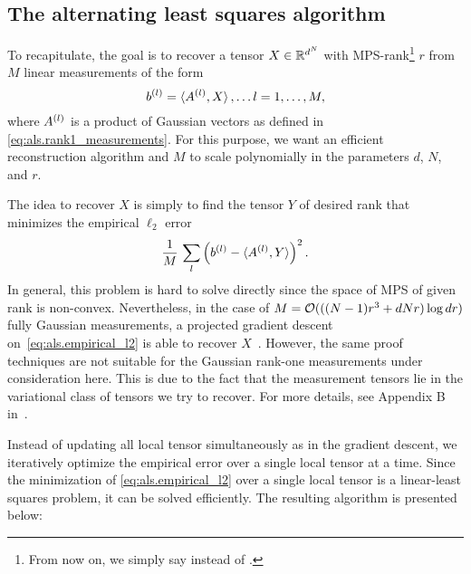 \subsection{The alternating least squares algorithm}%
\label{sub:als.algorithm}

To recapitulate, the goal is to recover a tensor $X \in {\mathbb{R}}^{d^N}$ with MPS-rank\footnote{%
  From now on, we simply say  instead of .
} $r$ from $M$ linear measurements of the form
\[
  b^{(l)} = \braket{A^{(l)}, X}, \ldots l=1,\ldots,M,
\]
where $A^{(l)}$ is a product of Gaussian vectors as defined in \cref{eq:als.rank1_measurements}.
For this purpose, we want an efficient reconstruction algorithm and $M$ to scale polynomially in the parameters $d$, $N$, and $r$.

The idea to recover $X$ is simply to find the tensor $Y$ of desired rank that minimizes the empirical $\ell_2$ error
\[
  \frac{1}{M} \, \sum_l \left( b^{(l)} - \braket{A^{(l)}, Y} \right)^2.
  \label{eq:als.empirical_l2}
\]
In general, this problem is hard to solve directly since the space of MPS of given rank is non-convex.
Nevertheless, in the case of $M={\mathcal{O}}(((N-1)r^3 + dNr) \log dr)$ fully Gaussian measurements, a projected gradient descent on~\eqref{eq:als.empirical_l2} is able to recover $X$~\cite{Rauhut_2014_Tensor,Rauhut_2016_Low}.
However, the same proof techniques are not suitable for the Gaussian rank-one measurements under consideration here.
This is due to the fact that the measurement tensors lie in the variational class of tensors we try to recover.
For more details, see Appendix B in~\cite{Zhong_2015_Efficient}.

Instead of updating all local tensor simultaneously as in the gradient descent, we iteratively optimize the empirical error over a single local tensor at a time.
Since the minimization of \cref{eq:als.empirical_l2} over a single local tensor is a linear-least squares problem, it can be solved efficiently.
The resulting algorithm is presented below:

